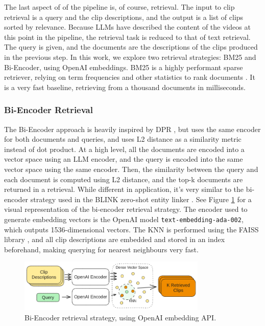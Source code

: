 The last aspect of of the pipeline is, of course, retrieval.
The input to clip retrieval is a query and the clip descriptions, and the output is a list of clips sorted by relevance.
Because LLMs have described the content of the videos at this point in the pipeline, the retrieval task is reduced to that of text retrieval.
The query is given, and the documents are the descriptions of the clips produced in the previous step.
In this work, we explore two retrieval strategies: BM25 and Bi-Encoder, using OpenAI embeddings.
BM25 is a highly performant sparse retriever, relying on term frequencies and other statistics to rank documents \cite{bm25}. %
It is a very fast baseline, retrieving from a thousand documents in milliseconds.

\subsubsection{Bi-Encoder Retrieval}
The Bi-Encoder approach is heavily inspired by DPR \cite{dpr}, but uses the same encoder for both documents and queries, and uses L2 distance as a similarity metric instead of dot product.
At a high level, all the documents are encoded into a vector space using an LLM encoder, and the query is encoded into the same vector space using the same encoder.
Then, the similarity between the query and each document is computed using L2 distance, and the top-k documents are returned in a retrieval.
While different in application, it's very similar to the bi-encoder strategy used in the BLINK zero-shot entity linker \cite{blink}.
See Figure \ref{fig:bienc} for a visual representation of the bi-encoder retrieval strategy.
The encoder used to generate embedding vectors is the OpenAI model \verb|text-embedding-ada-002|, which outputs 1536-dimensional vectors.
The KNN is performed using the FAISS library \cite{faiss}, and all clip descriptions are embedded and stored in an index beforehand, making querying for nearest neighbours very fast.

\begin{figure}
      \centering
      \includegraphics[width=0.8\textwidth]{figures/openai_DPR.png}
      \caption{Bi-Encoder retrieval strategy, using OpenAI embedding API.}
      \label{fig:bienc}
\end{figure}

